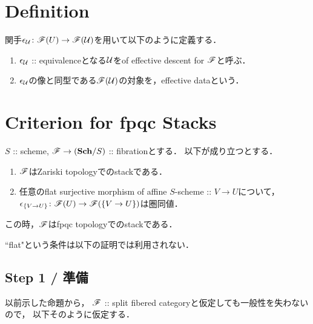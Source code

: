 \documentclass[a4paper]{jsarticle}
\begin{document}
\section{Definition}
\begin{Def}
    関手$\epsilon_{\mathcal{U}} \colon \mathscr{F}(U) \to \mathscr{F}(\mathcal{U})$を用いて以下のように定義する．
    \begin{enumerate}[label=(\roman*)]
        \item
            $\epsilon_{\mathcal{U}}$ :: equivalenceとなる$\mathcal{U}$をof effective descent for $\mathscr{F}$と呼ぶ．
        \item
            $\epsilon_{\mathcal{U}}$の像と同型である$\mathscr{F}(\mathcal{U})$の対象を，effective dataという．
    \end{enumerate}
\end{Def}

\section{Criterion for fpqc Stacks}
\begin{Thm}\label{thm:fpqccriterion}
    $S$ :: scheme,
    $\mathscr{F} \to (\mathbf{Sch}/S)$ :: fibrationとする．
    以下が成り立つとする．
    \begin{enumerate}[label=(\alph*)]
        \item $\mathscr{F}$はZariski topologyでのstackである．
        \item
            任意のflat surjective morphism of affine $S$-scheme :: $V \to U$について，\mnewline
            $\epsilon_{\{V \to U\}} \colon \mathscr{F}(U) \to \mathscr{F}(\{V \to U\})$は圏同値．
    \end{enumerate}
    この時，$\mathscr{F}$はfpqc topologyでのstackである．
\end{Thm}

\begin{Remark}
    ``flat"という条件は以下の証明では利用されない．
\end{Remark}

\subsection{Step 1 / 準備}
以前示した命題から，
$\mathscr{F}$ :: split fibered categoryと仮定しても一般性を失わないので，
以下そのように仮定する．
\end{document}
